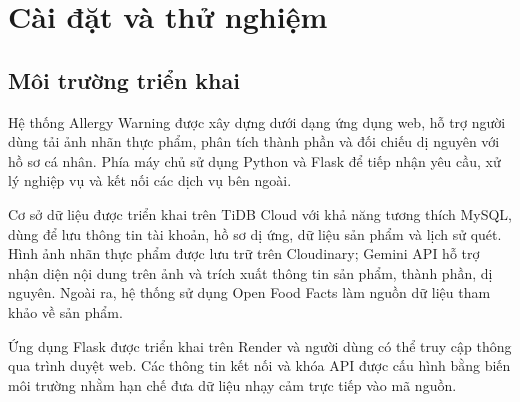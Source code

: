
\chapter{Cài đặt và thử nghiệm}
\label{ch:caidat}

\section{Môi trường triển khai}

Hệ thống Allergy Warning được xây dựng dưới dạng ứng dụng web, hỗ trợ người dùng tải ảnh nhãn thực phẩm, phân tích thành phần và đối chiếu dị nguyên với hồ sơ cá nhân. Phía máy chủ sử dụng Python và Flask để tiếp nhận yêu cầu, xử lý nghiệp vụ và kết nối các dịch vụ bên ngoài.

Cơ sở dữ liệu được triển khai trên TiDB Cloud với khả năng tương thích MySQL, dùng để lưu thông tin tài khoản, hồ sơ dị ứng, dữ liệu sản phẩm và lịch sử quét. Hình ảnh nhãn thực phẩm được lưu trữ trên Cloudinary; Gemini API hỗ trợ nhận diện nội dung trên ảnh và trích xuất thông tin sản phẩm, thành phần, dị nguyên. Ngoài ra, hệ thống sử dụng Open Food Facts làm nguồn dữ liệu tham khảo về sản phẩm.

Ứng dụng Flask được triển khai trên Render và người dùng có thể truy cập thông qua trình duyệt web. Các thông tin kết nối và khóa API được cấu hình bằng biến môi trường nhằm hạn chế đưa dữ liệu nhạy cảm trực tiếp vào mã nguồn.

